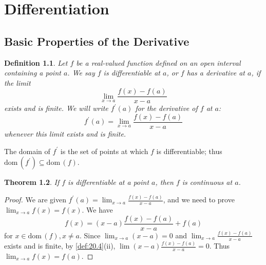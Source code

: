 \documentclass[12pt, lettersize]{book}
\newtheorem{thm}{Theorem}[section]
\newtheorem{dfn}[thm]{Definition}
\newcommand{\dom}{\text{dom}\,}
\begin{document}
	\chapter{Differentiation}
	\newpage
	\section{Basic Properties of the Derivative}
	\begin{dfn}\label{def:28.1}
		Let $f$ be a real-valued function defined on an open interval containing a point $a$. We say $f$ is \emph{differentiable} at $a$, or $f$ has a derivative at $a$, if the limit
		\begin{displaymath}
			\lim_{x\rightarrow a}\frac{f(x)-f(a)}{x-a}
		\end{displaymath}
		exists and is finite. We will write $f^\prime(a)$ for the derivative of $f$ at $a$:
		\begin{displaymath}
			f^\prime(a)=\lim_{x\rightarrow a}\frac{f(x)-f(a)}{x-a}
		\end{displaymath}
		whenever this limit exists and is finite.
	\end{dfn}
	The domain of $f^\prime$ is the set of points at which $f$ is differentiable; thus $\dom(f^\prime)\subseteq\dom(f)$.
	
	\begin{thm}\label{thm:28.2}
		If $f$ is differentiable at a point $a$, then $f$ is continuous at $a$.
	\end{thm}
	\begin{proof}
		We are given $f^\prime(a)=\lim_{x\rightarrow a}\frac{f(x)-f(a)}{x-a}$, and we need to prove $\lim_{x\rightarrow a}f(x)=f(x)$. We have 
		\begin{displaymath}
			f(x)=(x-a)\frac{f(x)-f(a)}{x-a}+f(a)
		\end{displaymath}
		for $x\in\dom(f), x\neq a$. Since $\lim_{x\rightarrow a}(x-a)=0$ and $\lim_{x\rightarrow a}\frac{f(x)-f(a)}{x-a}$ exists and is finite, by \ref{def:20.4}(ii), $\lim (x-a)\frac{f(x)-f(a)}{x-a}=0$. Thus $\lim_{x\rightarrow a}f(x)=f(a)$.
	\end{proof}
	
\end{document}
